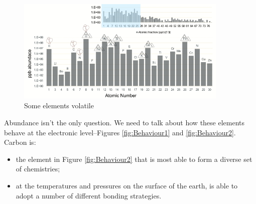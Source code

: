 \documentclass[]{article}
\begin{document}
\begin{figure}[H]
	\caption{Some elements volatile}\label{fig:volatiles} 
	\includegraphics[width=0.9\textwidth]{AbundancesGases}
\end{figure}

Abundance isn't the only question. We need to talk about how these elements behave at the electronic level--Figures \ref{fig:Behaviour1} and \ref{fig:Behaviour2}. Carbon is:
\begin{itemize}
	\item the element in Figure \ref{fig:Behaviour2} that is most able to form a diverse set of chemistries;
	\item at the temperatures and pressures on the surface of the earth, is able to adopt a number of different bonding strategies.
\end{itemize}
\end{document}
